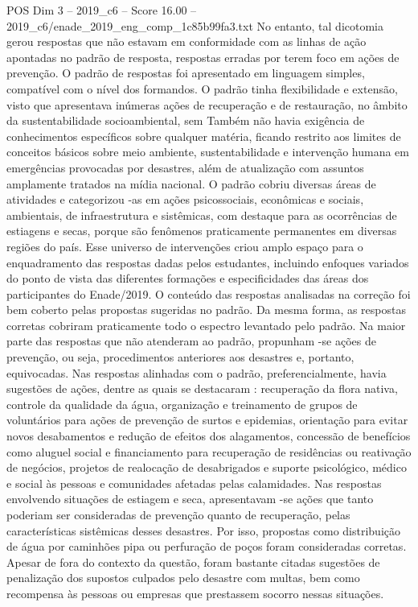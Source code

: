 \begin{textsample}{POS Dim 3 – 2019\_c6 – Score 16.00 – 2019\_c6/enade\_2019\_eng\_comp\_1c85b99fa3.txt}
No entanto, tal dicotomia gerou respostas que não estavam em conformidade com as linhas de ação apontadas no padrão de resposta, respostas erradas por terem foco em ações de prevenção.
O padrão de respostas foi apresentado em linguagem simples, compatível com o nível dos formandos.
O padrão tinha flexibilidade e extensão, visto que apresentava inúmeras ações de recuperação e de restauração, no âmbito da sustentabilidade socioambiental, sem Também não havia exigência de conhecimentos específicos sobre qualquer matéria, ficando restrito aos limites de conceitos básicos sobre meio ambiente, sustentabilidade e intervenção humana em emergências provocadas por desastres, além de atualização com assuntos amplamente tratados na mídia nacional.
O padrão cobriu diversas áreas de atividades e categorizou -as em ações psicossociais, econômicas e sociais, ambientais, de infraestrutura e sistêmicas, com destaque para as ocorrências de estiagens e secas, porque são fenômenos praticamente permanentes em diversas regiões do país.
Esse universo de intervenções criou amplo espaço para o enquadramento das respostas dadas pelos estudantes, incluindo enfoques variados do ponto de vista das diferentes formações e especificidades das áreas dos participantes do Enade/2019.
O conteúdo das respostas analisadas na correção foi bem coberto pelas propostas sugeridas no padrão.
Da mesma forma, as respostas corretas cobriram praticamente todo o espectro levantado pelo padrão.
Na maior parte das respostas que não atenderam ao padrão, propunham -se ações de prevenção, ou seja, procedimentos anteriores aos desastres e, portanto, equivocadas.
Nas respostas alinhadas com o padrão, preferencialmente, havia sugestões de ações, dentre as quais se destacaram : recuperação da flora nativa, controle da qualidade da água, organização e treinamento de grupos de voluntários para ações de prevenção de surtos e epidemias, orientação para evitar novos desabamentos e redução de efeitos dos alagamentos, concessão de benefícios como aluguel social e financiamento para recuperação de residências ou reativação de negócios, projetos de realocação de desabrigados e suporte psicológico, médico e social às pessoas e comunidades afetadas pelas calamidades.
Nas respostas envolvendo situações de estiagem e seca, apresentavam -se ações que tanto poderiam ser consideradas de prevenção quanto de recuperação, pelas características sistêmicas desses desastres.
Por isso, propostas como distribuição de água por caminhões pipa ou perfuração de poços foram consideradas corretas.
Apesar de fora do contexto da questão, foram bastante citadas sugestões de penalização dos supostos culpados pelo desastre com multas, bem como recompensa às pessoas ou empresas que prestassem socorro nessas situações.

\end{textsample}
